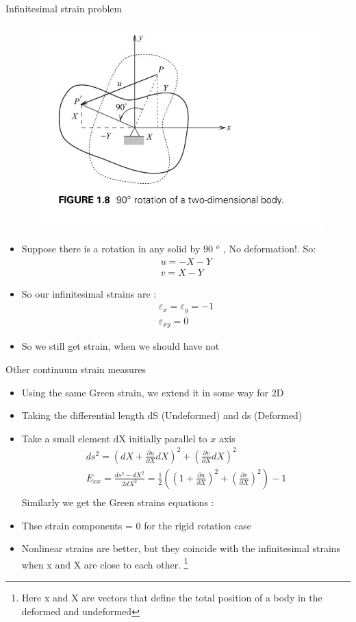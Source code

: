 	\begin{frame}{Infinitesimal strain problem}
		\begin{figure}
			\centering
			\includegraphics[width=0.4\linewidth]{Figure/fig6}
			\label{fig:fig1}
		\end{figure}
		\begin{block}{}
			\begin{itemize}
				\item Suppose there is a rotation in any solid by 90 $^o$ , No deformation!. So:
				\begin{align*}
					u = -X - Y \\
					v = X - Y 
				\end{align*}
				\item So our infinitesimal strains are :
				\begin{align*}
					\varepsilon_x = \varepsilon_y = -1 \\  \varepsilon_{xy} = 0
				\end{align*}		
				\item So we still get strain, when we should have not
			\end{itemize}
		\end{block}
	\end{frame}

	\begin{frame}{Other continuum strain measures}
		\begin{itemize}
			\item Using the same Green strain, we extend it in some way for 2D
			\item Taking the differential length dS (Undeformed) and ds (Deformed)
			\item Take a small element dX initially parallel to $x$ axis 			
			\begin{align*}
				ds^2 = \left(dX + \frac{\partial u}{\partial X} dX\right)^2 + \left(\frac{\partial v}{\partial X}dX \right)^2 \\				
				E_{xx} = \frac{ds^2-dX^2}{2dX^2} = \frac{1}{2} \left(\left(1 + \frac{\partial u}{\partial X} \right)^2 + \left(\frac{\partial v}{\partial X} \right)^2\right) - 1 \\
			\end{align*}
			Similarly we get the Green strains equations :
			
			
			\item Thse strain components = 0 for the rigid rotation case
			\item Nonlinear strains are better, but they coincide with the infinitesimal strains when x and X are close to each other. \footnote{Here x and X are vectors that define the total position of a body in the deformed and undeformed}
			
		\end{itemize}
	\end{frame}

